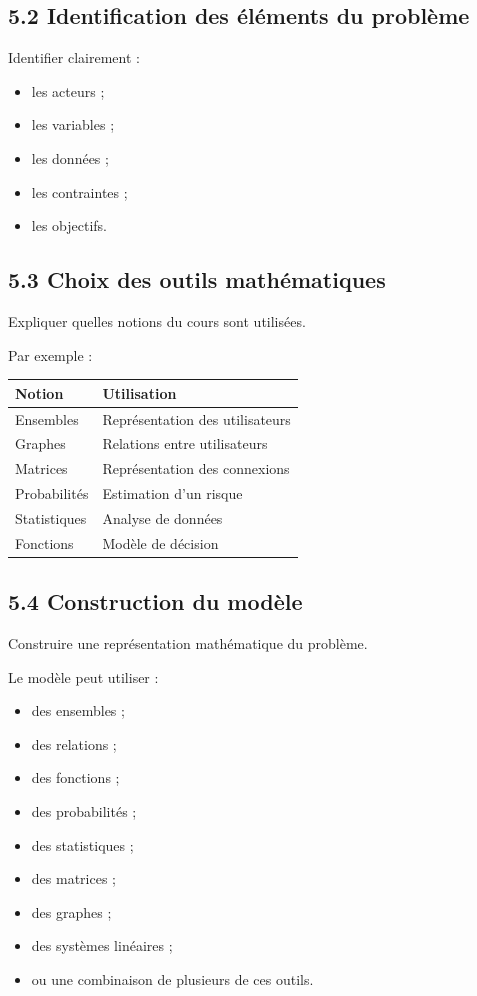 \documentclass[12pt,a4paper]{article}
\begin{document}
\subsection*{5.2 Identification des éléments du problème}

Identifier clairement :

\begin{itemize}
\item les acteurs ;
\item les variables ;
\item les données ;
\item les contraintes ;
\item les objectifs.
\end{itemize}

\subsection*{5.3 Choix des outils mathématiques}

Expliquer quelles notions du cours sont utilisées.

Par exemple :

\begin{center}
\begin{tabular}{|l|l|}
\hline
Notion & Utilisation \\
\hline
Ensembles & Représentation des utilisateurs \\
Graphes & Relations entre utilisateurs \\
Matrices & Représentation des connexions \\
Probabilités & Estimation d'un risque \\
Statistiques & Analyse de données \\
Fonctions & Modèle de décision \\
\hline
\end{tabular}
\end{center}

\subsection*{5.4 Construction du modèle}

Construire une représentation mathématique du problème.

Le modèle peut utiliser :

\begin{itemize}
\item des ensembles ;
\item des relations ;
\item des fonctions ;
\item des probabilités ;
\item des statistiques ;
\item des matrices ;
\item des graphes ;
\item des systèmes linéaires ;
\item ou une combinaison de plusieurs de ces outils.
\end{itemize}
\end{document}
